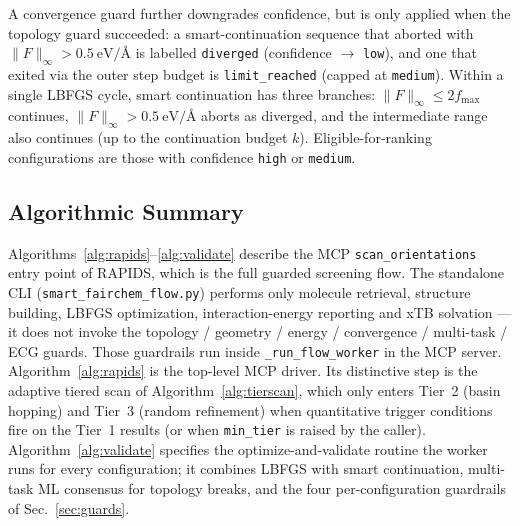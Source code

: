 A convergence guard further downgrades confidence, but is only
applied when the topology guard succeeded: a smart-continuation
sequence that aborted with $\|F\|_\infty > \SI{0.5}{\eV/\angstrom}$ is
labelled \texttt{diverged} (confidence $\to$ \texttt{low}), and one
that exited via the outer step budget is \texttt{limit\_reached}
(capped at \texttt{medium}). Within a single LBFGS cycle, smart
continuation has three branches: $\|F\|_\infty \le 2 f_{\max}$
continues, $\|F\|_\infty > \SI{0.5}{\eV/\angstrom}$ aborts as
diverged, and the intermediate range also continues (up to the
continuation budget $k$). Eligible-for-ranking configurations are
those with confidence \texttt{high} or \texttt{medium}.

\subsection{Algorithmic Summary}
\label{sec:algorithms}

Algorithms~\ref{alg:rapids}--\ref{alg:validate} describe the MCP
\texttt{scan\_orientations} entry point of RAPIDS, which is the full
guarded screening flow. The standalone CLI
(\texttt{smart\_fairchem\_flow.py}) performs only molecule retrieval,
structure building, LBFGS optimization, interaction-energy reporting
and xTB solvation --- it does not invoke the topology / geometry /
energy / convergence / multi-task / ECG guards. Those guardrails run
inside \texttt{\_run\_flow\_worker} in the MCP server.
Algorithm~\ref{alg:rapids} is the top-level MCP driver. Its
distinctive step is the adaptive tiered scan of
Algorithm~\ref{alg:tierscan}, which only enters Tier~2 (basin hopping)
and Tier~3 (random refinement) when quantitative trigger conditions
fire on the Tier~1 results (or when \texttt{min\_tier} is raised by
the caller). Algorithm~\ref{alg:validate} specifies the
optimize-and-validate routine the worker runs for every configuration;
it combines LBFGS with smart continuation, multi-task ML consensus
for topology breaks, and the four per-configuration guardrails of
Sec.~\ref{sec:guards}.

\newcommand{\RapidsComment}[1]{\hfill\textcolor{black!55}{\scriptsize\textit{#1}}}

